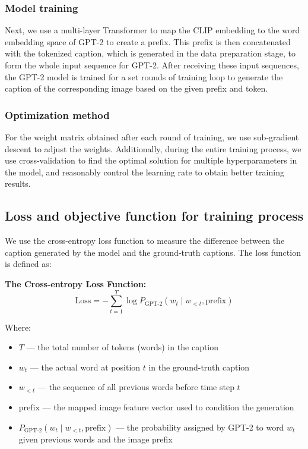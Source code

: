 \documentclass[11pt]{article}
\begin{document}
    \subsubsection{Model training}
    Next, we use a multi-layer Transformer to map the 
    CLIP embedding to the word embedding space of GPT-2 
    to create a prefix. This prefix is then concatenated 
    with the tokenized caption, which is generated in the data preparation stage,  
    to form the whole input sequence for GPT-2. After receiving these input sequences, 
    the GPT-2 model is trained for a set rounds of training loop to generate the caption of the corresponding image based on the given prefix and token.

    \subsubsection{Optimization method}
    For the weight matrix obtained after each round of training, we use sub-gradient descent 
    to adjust the weights. Additionally, during the entire training process, we use cross-validation to 
    find the optimal solution for multiple hyperparameters in the model, and reasonably control the learning rate to obtain better training results.
\subsection{Loss and objective function for training process}

We use the cross-entropy loss function to measure the difference between the caption generated by the model and the ground-truth captions. The loss function is defined as:

\textbf{The Cross-entropy Loss Function:}
\begin{equation}
\text{Loss} = -\sum_{t=1}^{T} \log P_{\text{GPT-2}}(w_t \mid w_{<t}, \text{prefix})
\end{equation}

Where:  
\begin{itemize}
    \item $T$ — the total number of tokens (words) in the caption  
    \item $w_t$ — the actual word at position $t$ in the ground-truth caption  
    \item $w_{<t}$ — the sequence of all previous words before time step $t$  
    \item $\text{prefix}$ — the mapped image feature vector used to condition the generation  
    \item $P_{\text{GPT-2}}(w_t \mid w_{<t}, \text{prefix})$ — the probability assigned by GPT-2 to word $w_t$ given previous words and the image prefix
\end{itemize}
\end{document}
